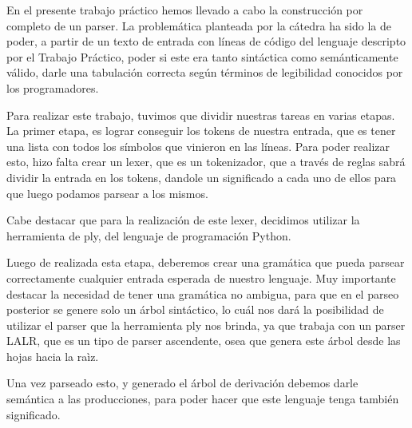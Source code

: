 En el presente trabajo práctico hemos llevado a cabo la construcción por completo de un parser. 
La problemática planteada por la cátedra ha sido la de poder, a partir de un texto de entrada con líneas de 
código del lenguaje descripto por el Trabajo Práctico, poder si este era tanto sintáctica como semánticamente válido, 
darle una tabulación correcta según términos de legibilidad conocidos por los programadores. 

Para realizar este trabajo, tuvimos que dividir nuestras tareas en varias etapas. 
La primer etapa, es lograr conseguir los tokens de nuestra entrada, que es tener una lista con todos los símbolos que 
vinieron en las líneas. Para poder realizar esto, hizo falta crear un lexer, que es un tokenizador, que a través de reglas 
sabrá dividir la entrada en los tokens, dandole un significado a cada uno de ellos para que luego podamos parsear a los mismos. 

Cabe destacar que para la realización de este lexer, decidimos utilizar la herramienta de ply,
del lenguaje de programación Python. 

Luego de realizada esta etapa, deberemos crear una gramática que pueda parsear correctamente cualquier entrada esperada
de nuestro lenguaje. Muy importante destacar la necesidad de tener una gramática no ambigua, para que en el parseo posterior
se genere solo un árbol sintáctico, lo cuál nos dará la posibilidad de utilizar el parser que la herramienta ply nos brinda, 
ya que trabaja con un parser LALR, que es un tipo de parser ascendente, osea que genera este árbol desde las hojas
hacia la raìz. 

Una vez parseado esto, y generado el árbol de derivación debemos darle semántica a las producciones, para poder 
hacer que este lenguaje tenga también significado. 


